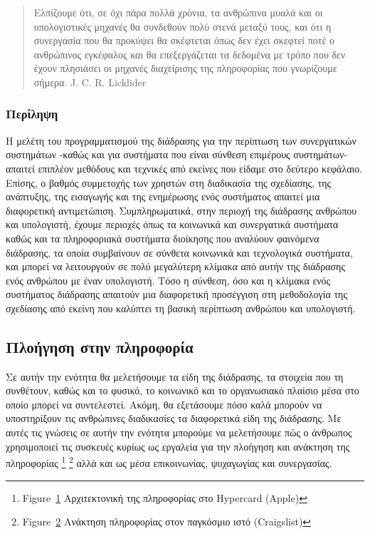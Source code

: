 \documentclass[
]{article}
\begin{document}
\begin{quote}
Ελπίζουμε ότι, σε όχι πάρα πολλά χρόνια, τα ανθρώπινα μυαλά και οι
υπολογιστικές μηχανές θα συνδεθούν πολύ στενά μεταξύ τους, και ότι η
συνεργασία που θα προκύψει θα σκέφτεται όπως δεν έχει σκεφτεί ποτέ ο
ανθρώπινος εγκέφαλος και θα επεξεργάζεται τα δεδομένα με τρόπο που δεν
έχουν πλησιάσει οι μηχανές διαχείρισης της πληροφορίας που γνωρίζουμε
σήμερα. J. C. R. Licklider
\end{quote}

\hypertarget{ux3c0ux3b5ux3c1ux3afux3bbux3b7ux3c8ux3b7}{%
\subsubsection{Περίληψη}\label{ux3c0ux3b5ux3c1ux3afux3bbux3b7ux3c8ux3b7}}

Η μελέτη του προγραμματισμού της διάδρασης για την περίπτωση των
συνεργατικών συστημάτων -καθώς και για συστήματα που είναι σύνθεση
επιμέρους συστημάτων- απαιτεί επιπλέον μεθόδους και τεχνικές από εκείνες
που είδαμε στο δεύτερο κεφάλαιο. Επίσης, ο βαθμός συμμετοχής των χρηστών
στη διαδικασία της σχεδίασης, της ανάπτυξης, της εισαγωγής και της
ενημέρωσης ενός συστήματος απαιτεί μια διαφορετική αντιμετώπιση.
Συμπληρωματικά, στην περιοχή της διάδρασης ανθρώπου και υπολογιστή,
έχουμε περιοχές όπως τα κοινωνικά και συνεργατικά συστήματα καθώς και τα
πληροφοριακά συστήματα διοίκησης που αναλύουν φαινόμενα διάδρασης, τα
οποία συμβαίνουν σε σύνθετα κοινωνικά και τεχνολογικά συστήματα, και
μπορεί να λειτουργούν σε πολύ μεγαλύτερη κλίμακα από αυτήν της διάδρασης
ενός ανθρώπου με έναν υπολογιστή. Τόσο η σύνθεση, όσο και η κλίμακα ενός
συστήματος διάδρασης απαιτούν μια διαφορετική προσέγγιση στη μεθοδολογία
της σχεδίασης από εκείνη που καλύπτει τη βασική περίπτωση ανθρώπου και
υπολογιστή.

\hypertarget{ux3c0ux3bbux3bfux3aeux3b3ux3b7ux3c3ux3b7-ux3c3ux3c4ux3b7ux3bd-ux3c0ux3bbux3b7ux3c1ux3bfux3c6ux3bfux3c1ux3afux3b1}{%
\subsection{Πλοήγηση στην
πληροφορία}\label{ux3c0ux3bbux3bfux3aeux3b3ux3b7ux3c3ux3b7-ux3c3ux3c4ux3b7ux3bd-ux3c0ux3bbux3b7ux3c1ux3bfux3c6ux3bfux3c1ux3afux3b1}}

Σε αυτήν την ενότητα θα μελετήσουμε τα είδη της διάδρασης, τα στοιχεία
που τη συνθέτουν, καθώς και το φυσικό, το κοινωνικό και το οργανωσιακό
πλαίσιο μέσα στο οποίο μπορεί να συντελεστεί. Ακόμη, θα εξετάσουμε πόσο
καλά μπορούν να υποστηρίξουν τις ανθρώπινες διαδικασίες τα διαφορετικά
είδη της διάδρασης. Με αυτές τις γνώσεις σε αυτήν την ενότητα μπορούμε
να μελετήσουμε πώς ο άνθρωπος χρησιμοποιεί τις συσκευές κυρίως ως
εργαλεία για την πλοήγηση και ανάκτηση της πληροφορίας \footnote{Figure~\protect\hyperlink{fig:hypercard-layout}{1}
  Αρχιτεκτονική της πληροφορίας στο Hypercard (Apple)} \footnote{Figure~\protect\hyperlink{fig:web-search}{2}
  Ανάκτηση πληροφορίας στον παγκόσμιο ιστό (Craigslist)} αλλά και ως
μέσα επικοινωνίας, ψυχαγωγίας και συνεργασίας.
\end{document}
